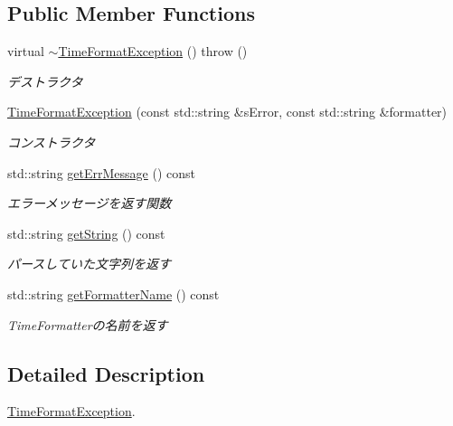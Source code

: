 \subsection*{Public Member Functions}
\begin{DoxyCompactItemize}
\item 
\hypertarget{classskl_1_1_time_format_exception_a5704eda6974105a00e17437ca3b2fa0d}{}\label{classskl_1_1_time_format_exception_a5704eda6974105a00e17437ca3b2fa0d} 
virtual \hyperlink{classskl_1_1_time_format_exception_a5704eda6974105a00e17437ca3b2fa0d}{$\sim$\+Time\+Format\+Exception} ()  throw ()
\begin{DoxyCompactList}\small\item\em デストラクタ \end{DoxyCompactList}\item 
\hyperlink{classskl_1_1_time_format_exception_ae2d980f18722c3b6e209f0abd36a427f}{Time\+Format\+Exception} (const std\+::string \&s\+Error, const std\+::string \&formatter)
\begin{DoxyCompactList}\small\item\em コンストラクタ \end{DoxyCompactList}\item 
std\+::string \hyperlink{classskl_1_1_time_format_exception_af94af572753b869b0056ea1aae3ae7b1}{get\+Err\+Message} () const
\begin{DoxyCompactList}\small\item\em エラーメッセージを返す関数 \end{DoxyCompactList}\item 
std\+::string \hyperlink{classskl_1_1_time_format_exception_adbc030198a2811494d377c89779d4aa3}{get\+String} () const
\begin{DoxyCompactList}\small\item\em パースしていた文字列を返す \end{DoxyCompactList}\item 
std\+::string \hyperlink{classskl_1_1_time_format_exception_a1b6c5b3b707be88e33fe1d2f39482b76}{get\+Formatter\+Name} () const
\begin{DoxyCompactList}\small\item\em Time\+Formatterの名前を返す \end{DoxyCompactList}\end{DoxyCompactItemize}


\subsection{Detailed Description}
\hyperlink{classskl_1_1_time_format_exception}{Time\+Format\+Exception}. 

